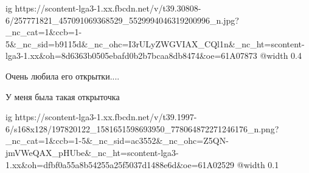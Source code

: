  
 
 
 
 

\ifcmt
  ig https://scontent-lga3-1.xx.fbcdn.net/v/t39.30808-6/257771821_457091069368529_5529994046319200996_n.jpg?_nc_cat=1&ccb=1-5&_nc_sid=b9115d&_nc_ohc=I3rULyZWGVIAX_CQl1n&_nc_ht=scontent-lga3-1.xx&oh=8d6363b0505ebafd0b2b7bcaa8db8474&oe=61A07873
	@width 0.4
\fi

Очень любила его открытки....

У меня была такая открыточка


\ifcmt
  ig https://scontent-lga3-1.xx.fbcdn.net/v/t39.1997-6/s168x128/197820122_1581651598693950_778064872271246176_n.png?_nc_cat=1&ccb=1-5&_nc_sid=ac3552&_nc_ohc=Z5QN-jmVWeQAX_pHUbe&_nc_ht=scontent-lga3-1.xx&oh=dfbf0a55a8b54255a25f5037d1488e6d&oe=61A02529
  @width 0.1
\fi
